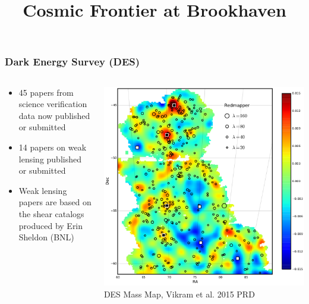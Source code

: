 \documentclass{beamer}
\title{Cosmic Frontier at Brookhaven}
\begin{document}

\frame
{

    \frametitle{Dark Energy Survey (DES)}

    \fontsize{9}{0.8\baselineskip}

    \begin{columns}

        \begin{column}{0.5\textwidth}

            \begin{itemize}

                \item 45 papers from science verification data now published
                    or submitted

                \item 14 papers on weak lensing published or submitted

                \item Weak lensing papers are based on the shear catalogs produced
                    by Erin Sheldon (BNL)

            \end{itemize}

        \end{column}

        \begin{column}{0.5\textwidth}
            \includegraphics[scale=0.17]{cluster_overlay_ngmix_bpz.pdf}
            \newline
            {\tiny DES Mass Map, Vikram et al. 2015 PRD}
        \end{column}

    \end{columns}

}
\end{document}
